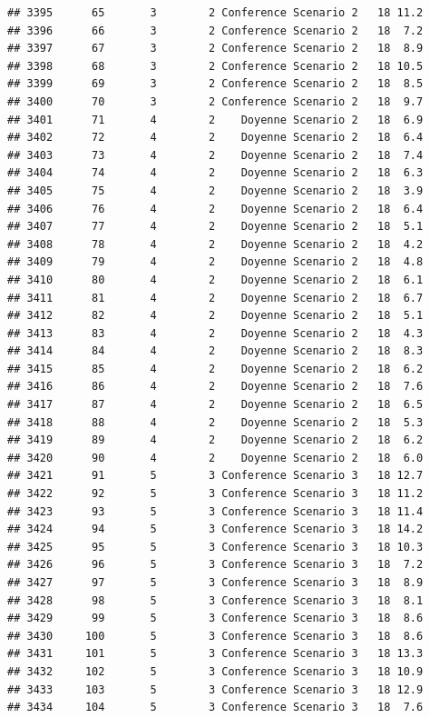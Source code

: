 \documentclass[
]{article}
\begin{document}
\begin{verbatim}
## 3395      65       3        2 Conference Scenario 2   18 11.2
## 3396      66       3        2 Conference Scenario 2   18  7.2
## 3397      67       3        2 Conference Scenario 2   18  8.9
## 3398      68       3        2 Conference Scenario 2   18 10.5
## 3399      69       3        2 Conference Scenario 2   18  8.5
## 3400      70       3        2 Conference Scenario 2   18  9.7
## 3401      71       4        2    Doyenne Scenario 2   18  6.9
## 3402      72       4        2    Doyenne Scenario 2   18  6.4
## 3403      73       4        2    Doyenne Scenario 2   18  7.4
## 3404      74       4        2    Doyenne Scenario 2   18  6.3
## 3405      75       4        2    Doyenne Scenario 2   18  3.9
## 3406      76       4        2    Doyenne Scenario 2   18  6.4
## 3407      77       4        2    Doyenne Scenario 2   18  5.1
## 3408      78       4        2    Doyenne Scenario 2   18  4.2
## 3409      79       4        2    Doyenne Scenario 2   18  4.8
## 3410      80       4        2    Doyenne Scenario 2   18  6.1
## 3411      81       4        2    Doyenne Scenario 2   18  6.7
## 3412      82       4        2    Doyenne Scenario 2   18  5.1
## 3413      83       4        2    Doyenne Scenario 2   18  4.3
## 3414      84       4        2    Doyenne Scenario 2   18  8.3
## 3415      85       4        2    Doyenne Scenario 2   18  6.2
## 3416      86       4        2    Doyenne Scenario 2   18  7.6
## 3417      87       4        2    Doyenne Scenario 2   18  6.5
## 3418      88       4        2    Doyenne Scenario 2   18  5.3
## 3419      89       4        2    Doyenne Scenario 2   18  6.2
## 3420      90       4        2    Doyenne Scenario 2   18  6.0
## 3421      91       5        3 Conference Scenario 3   18 12.7
## 3422      92       5        3 Conference Scenario 3   18 11.2
## 3423      93       5        3 Conference Scenario 3   18 11.4
## 3424      94       5        3 Conference Scenario 3   18 14.2
## 3425      95       5        3 Conference Scenario 3   18 10.3
## 3426      96       5        3 Conference Scenario 3   18  7.2
## 3427      97       5        3 Conference Scenario 3   18  8.9
## 3428      98       5        3 Conference Scenario 3   18  8.1
## 3429      99       5        3 Conference Scenario 3   18  8.6
## 3430     100       5        3 Conference Scenario 3   18  8.6
## 3431     101       5        3 Conference Scenario 3   18 13.3
## 3432     102       5        3 Conference Scenario 3   18 10.9
## 3433     103       5        3 Conference Scenario 3   18 12.9
## 3434     104       5        3 Conference Scenario 3   18  7.6

\end{verbatim}
\end{document}
